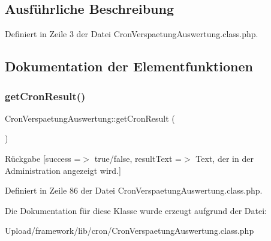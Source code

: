 \subsection{Ausführliche Beschreibung}


Definiert in Zeile 3 der Datei Cron\+Verspaetung\+Auswertung.\+class.\+php.



\subsection{Dokumentation der Elementfunktionen}
\mbox{\label{class_cron_verspaetung_auswertung_a7c0b5dffb3075557eb6af58f18e7eb5c}} 
\subsubsection{\texorpdfstring{get\+Cron\+Result()}{getCronResult()}}
{\footnotesize\ttfamily Cron\+Verspaetung\+Auswertung\+::get\+Cron\+Result (\begin{DoxyParamCaption}{ }\end{DoxyParamCaption})}

\begin{DoxyReturn}{Rückgabe}
\mbox{[}\textquotesingle{}success\textquotesingle{} =$>$ \textquotesingle{}true/false\textquotesingle{}, \textquotesingle{}result\+Text\textquotesingle{} =$>$ \textquotesingle{}Text, der in der Administration angezeigt wird.\textquotesingle{}\mbox{]} 
\end{DoxyReturn}


Definiert in Zeile 86 der Datei Cron\+Verspaetung\+Auswertung.\+class.\+php.



Die Dokumentation für diese Klasse wurde erzeugt aufgrund der Datei\+:\begin{DoxyCompactItemize}
\item 
Upload/framework/lib/cron/Cron\+Verspaetung\+Auswertung.\+class.\+php\end{DoxyCompactItemize}
